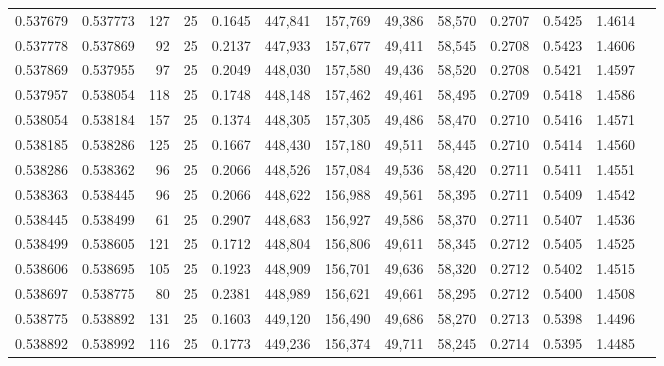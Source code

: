\begin{tabular}{rrrrrrrrrrrrr}
0.537679 & 0.537773 &   127 &  25 &                                     0.1645 & 447,841 & 157,769 &  49,386 &  58,570 & 0.2707 & 0.5425 & 1.4614 \\
0.537778 & 0.537869 &    92 &  25 &                                     0.2137 & 447,933 & 157,677 &  49,411 &  58,545 & 0.2708 & 0.5423 & 1.4606 \\
0.537869 & 0.537955 &    97 &  25 &                                     0.2049 & 448,030 & 157,580 &  49,436 &  58,520 & 0.2708 & 0.5421 & 1.4597 \\
0.537957 & 0.538054 &   118 &  25 &                                     0.1748 & 448,148 & 157,462 &  49,461 &  58,495 & 0.2709 & 0.5418 & 1.4586 \\
0.538054 & 0.538184 &   157 &  25 &                                     0.1374 & 448,305 & 157,305 &  49,486 &  58,470 & 0.2710 & 0.5416 & 1.4571 \\
0.538185 & 0.538286 &   125 &  25 &                                     0.1667 & 448,430 & 157,180 &  49,511 &  58,445 & 0.2710 & 0.5414 & 1.4560 \\
0.538286 & 0.538362 &    96 &  25 &                                     0.2066 & 448,526 & 157,084 &  49,536 &  58,420 & 0.2711 & 0.5411 & 1.4551 \\
0.538363 & 0.538445 &    96 &  25 &                                     0.2066 & 448,622 & 156,988 &  49,561 &  58,395 & 0.2711 & 0.5409 & 1.4542 \\
0.538445 & 0.538499 &    61 &  25 &                                     0.2907 & 448,683 & 156,927 &  49,586 &  58,370 & 0.2711 & 0.5407 & 1.4536 \\
0.538499 & 0.538605 &   121 &  25 &                                     0.1712 & 448,804 & 156,806 &  49,611 &  58,345 & 0.2712 & 0.5405 & 1.4525 \\
0.538606 & 0.538695 &   105 &  25 &                                     0.1923 & 448,909 & 156,701 &  49,636 &  58,320 & 0.2712 & 0.5402 & 1.4515 \\
0.538697 & 0.538775 &    80 &  25 &                                     0.2381 & 448,989 & 156,621 &  49,661 &  58,295 & 0.2712 & 0.5400 & 1.4508 \\
0.538775 & 0.538892 &   131 &  25 &                                     0.1603 & 449,120 & 156,490 &  49,686 &  58,270 & 0.2713 & 0.5398 & 1.4496 \\
0.538892 & 0.538992 &   116 &  25 &                                     0.1773 & 449,236 & 156,374 &  49,711 &  58,245 & 0.2714 & 0.5395 & 1.4485 \\

\end{tabular}
